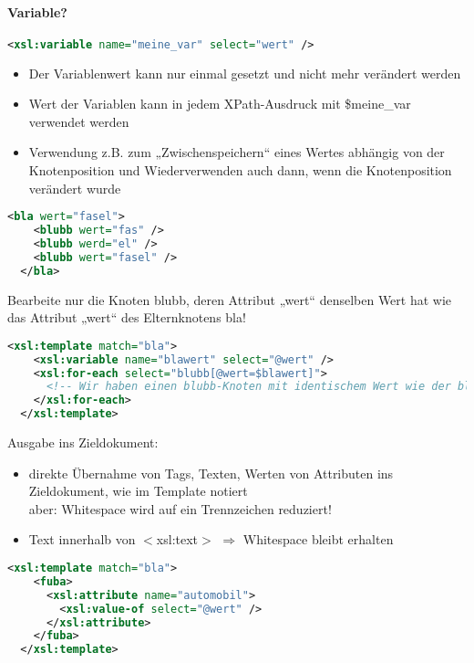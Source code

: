\paragraph{Variable?}\hspace{1mm}
\begin{lstlisting}[caption={xsl:variable Syntax}, label={lst:xsl:variable}, language={XML}]
  <xsl:variable name="meine_var" select="wert" />
\end{lstlisting}
\begin{itemize}
\item Der Variablenwert kann nur einmal gesetzt und nicht mehr verändert werden
\item Wert der Variablen kann in jedem XPath-Ausdruck mit \$meine\_var verwendet werden
\item Verwendung z.B. zum „Zwischenspeichern“ eines Wertes abhängig von der Knotenposition und Wiederverwenden auch dann, wenn die Knotenposition verändert wurde
\end{itemize}
\begin{lstlisting}[caption={Beispiel für Variablendeklaration}, label={lst:xsl:variable}, language={XML}]
  <bla wert="fasel">
    <blubb wert="fas" />
    <blubb werd="el" />
    <blubb wert="fasel" />
  </bla>
\end{lstlisting}
Bearbeite nur die Knoten blubb, deren Attribut „wert“ denselben Wert hat wie das Attribut „wert“ des Elternknotens bla!\\
\begin{lstlisting}[caption={Beispiel für Variable in Template}, label={lst:xsl:variable_in_template}, language={XML}]
  <xsl:template match="bla">
    <xsl:variable name="blawert" select="@wert" />
    <xsl:for-each select="blubb[@wert=$blawert]">
      <!-- Wir haben einen blubb-Knoten mit identischem Wert wie der bla-Knoten! -->
    </xsl:for-each>
  </xsl:template>
\end{lstlisting}

Ausgabe ins Zieldokument:
\begin{itemize}
\item direkte Übernahme von Tags, Texten, Werten von Attributen ins Zieldokument, wie im Template notiert\\
aber: Whitespace wird auf ein Trennzeichen reduziert!
\item Text innerhalb von $<$xsl:text$>$ $\Rightarrow$ Whitespace bleibt erhalten
\end{itemize}

\begin{lstlisting}[caption={Beispiel für Variable in Template}, label={lst:xsl:variable_in_template}, language={XML}]
  <xsl:template match="bla">
    <fuba>
      <xsl:attribute name="automobil">
        <xsl:value-of select="@wert" />
      </xsl:attribute>
    </fuba>
  </xsl:template>
\end{lstlisting}

